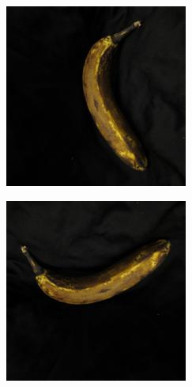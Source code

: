 \documentclass[final]{beamer}
\newlength{\onecolwid}
\begin{document}
\begin{frame}[t]
\begin{columns}[t]
\begin{column}{\onecolwid}
\begin{figure}
\begin{subfigure}{.123\textwidth}
\end{subfigure}%
 \begin{subfigure}{.123\textwidth}
  \centering
\includegraphics[width=\textwidth]{0_2.jpg}
\end{subfigure}%
  \begin{subfigure}{.123\textwidth}
  \centering
\includegraphics[width=\textwidth]{0_3.jpg}

\end{subfigure}
\end{figure}
\end{column}
\end{columns}
\end{frame}
\end{document}
